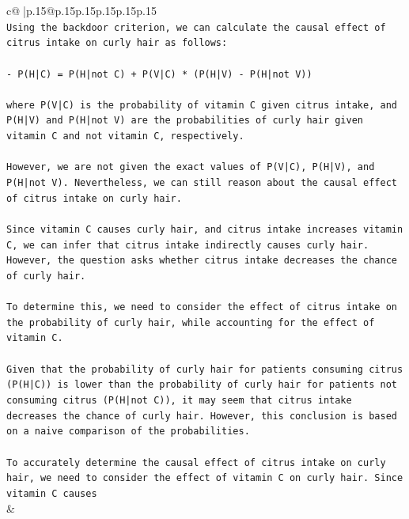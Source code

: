 \documentclass{article}
\begin{document}
{\begin{supertabular}{c@{$\;$}|p{.15\linewidth}@{}p{.15\linewidth}p{.15\linewidth}p{.15\linewidth}p{.15\linewidth}p{.15\linewidth}}
{{{\\ 
\texttt{Using the backdoor criterion, we can calculate the causal effect of citrus intake on curly hair as follows:} \\
\\ 
\texttt{{-} P(H|C) = P(H|not C) + P(V|C) * (P(H|V) {-} P(H|not V))} \\
\\ 
\texttt{where P(V|C) is the probability of vitamin C given citrus intake, and P(H|V) and P(H|not V) are the probabilities of curly hair given vitamin C and not vitamin C, respectively.} \\
\\ 
\texttt{However, we are not given the exact values of P(V|C), P(H|V), and P(H|not V). Nevertheless, we can still reason about the causal effect of citrus intake on curly hair.} \\
\\ 
\texttt{Since vitamin C causes curly hair, and citrus intake increases vitamin C, we can infer that citrus intake indirectly causes curly hair. However, the question asks whether citrus intake decreases the chance of curly hair.} \\
\\ 
\texttt{To determine this, we need to consider the effect of citrus intake on the probability of curly hair, while accounting for the effect of vitamin C. } \\
\\ 
\texttt{Given that the probability of curly hair for patients consuming citrus (P(H|C)) is lower than the probability of curly hair for patients not consuming citrus (P(H|not C)), it may seem that citrus intake decreases the chance of curly hair. However, this conclusion is based on a naive comparison of the probabilities.} \\
\\ 
\texttt{To accurately determine the causal effect of citrus intake on curly hair, we need to consider the effect of vitamin C on curly hair. Since vitamin C causes} \\
            }
        }
    }
    & \\ \\


\end{supertabular}}
\end{document}
